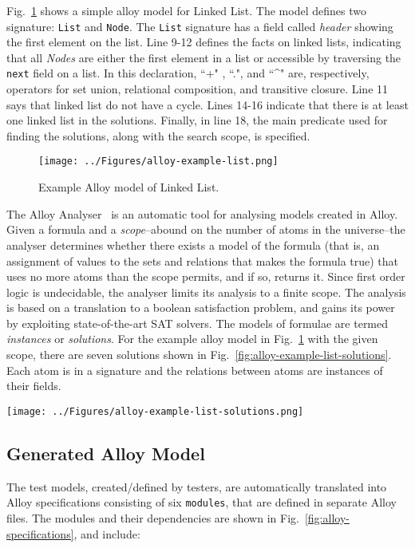 Fig.~\ref{fig:alloy-example-list} shows a simple alloy model for Linked List. The model defines two signature: \texttt{List} and \texttt{Node}. The \texttt{List} signature has a field called \textit{header} showing the first element on the list. Line 9-12 defines the facts on linked lists, indicating that all \textit{Nodes} are either the first element in a list or accessible by traversing the \texttt{next} field on a list. In this declaration, ``+" , ``.", and ``\^{}" are, respectively, operators for set union, relational composition, and transitive closure. Line 11 says that linked list do not have a cycle. Lines 14-16 indicate that there is at least one linked list in the solutions. Finally, in line 18, the main predicate used for finding the solutions, along with the search scope, is specified. 

\begin{figure}[h]
\centering
\texttt{[image: ../Figures/alloy-example-list.png]}
\caption{Example Alloy model of Linked List.}
\label{fig:alloy-example-list}
\end{figure}

The Alloy Analyser~\cite{Jackson2000} is an automatic tool for analysing models created in Alloy. Given a formula and a \textit{scope}--abound on the number of atoms in the universe--the analyser determines whether there exists a model of the formula (that is, an assignment of values to the sets and relations that makes the formula true) that uses no more atoms than the scope permits, and if so, returns it. Since first order logic is undecidable, the analyser limits its analysis to a finite scope. The analysis is based on a translation to a boolean satisfaction problem, and gains its power by exploiting state-of-the-art SAT solvers. The models of formulae are termed \textit{instances} or \textit{solutions}. For the example alloy model in Fig.~\ref{fig:alloy-example-list} with the given scope, there are seven solutions shown in Fig.~\ref{fig:alloy-example-list-solutions}. Each atom is in a signature and the relations between atoms are instances of their fields.

\begin{figure*}[h]
\centering
\texttt{[image: ../Figures/alloy-example-list-solutions.png]}
\caption{Solutions for the example Alloy model of Linked List.}
\label{fig:alloy-example-list-solutions}
\end{figure*}

\subsection{Generated Alloy Model}
\label{sec:test-generation-execution-alloy-models}
The test models, created/defined by testers, are automatically translated into Alloy specifications consisting of six \texttt{modules}, that are defined in separate Alloy files. The modules and their dependencies are shown in Fig.~\ref{fig:alloy-specifications}, and include:

